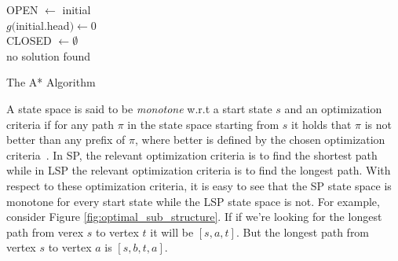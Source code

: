 


\begin{algorithm}
\SetAlgoLined
    OPEN $\gets$ initial\\
    $g($initial.head$)\gets 0$\\
    CLOSED $\gets \emptyset$\\
    \Return no solution found
 \caption{The A* Algorithm}
 \label{alg:astar}
\end{algorithm}



A state space is said to be \emph{monotone} w.r.t a start state $s$ 
and an optimization criteria if for any path $\pi$ in the state space starting from $s$ it holds that $\pi$ is not better than any prefix of $\pi$, where better is defined by the chosen optimization criteria~\cite{DBLP:conf/socs/SternKPFR14}. In SP, the relevant optimization criteria is to find the shortest path while in LSP the relevant optimization criteria is to find the longest path. With respect to these optimization criteria, it is easy to see that the SP state space is monotone for every start state while the LSP state space is not. For example, consider Figure \ref{fig:optimal_sub_structure}. If if we're looking for the longest path from verex $s$ to vertex $t$ it will be $[s,a,t]$. But the longest path from vertex $s$ to vertex $a$ is $[s,b,t,a]$.

